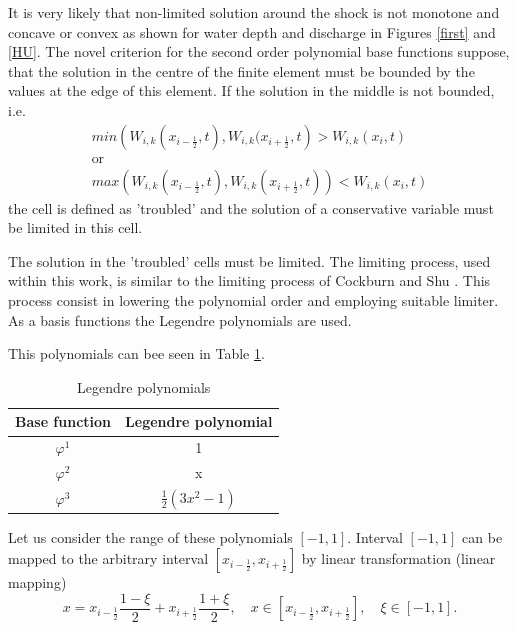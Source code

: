 It is very likely that non-limited solution around the shock is not monotone and concave or convex as shown for water depth and discharge in Figures \ref{first} and \ref{HU}. The novel criterion for the second order polynomial base functions suppose, that the solution in the centre of the finite element must be bounded by the values at the edge of this element. If the solution in the middle is not bounded, i.e.
\begin{equation}\label{crit}
\begin{array}{c}
 min\left(W_{i,k}(x_{i-\frac12},t),W_{i,k}(x_{i+\frac12},t\right)>W_{i,k}(x_i,t)\\
\text{or}\\
 max\left(W_{i,k}(x_{i-\frac12},t),W_{i,k}(x_{i+\frac12},t)\right)< W_{i,k}(x_i,t)
 \end{array}
\end{equation}
the cell is defined as 'troubled' and the solution of a conservative variable must be limited in this cell.

The solution in the 'troubled' cells must be limited. The limiting process, used within this work, is similar to the limiting process of Cockburn and Shu \cite{Cockburn1989b}. This process consist in lowering the polynomial order and employing suitable limiter. As a basis functions the Legendre polynomials are used.

 This polynomials can bee seen in Table \ref{table:legendre}.
\begin{table}
\caption{Legendre polynomials}
\centering
\begin{tabular}{|c|c |}
\hline
Base function & Legendre polynomial\\
\hline
\hline
$\varphi^1$ & 1\\
$\varphi^2$ & x\\
$\varphi^3$ & $\frac12\left(3x^2-1\right)$\\
\hline
\end{tabular}
\label{table:legendre}%
\end{table}
Let us consider the range of these polynomials $[-1,1]$. Interval $[-1,1]$ can be mapped to the arbitrary interval $[x_{i-\frac12},x_{i+\frac12}]$ by linear transformation (linear mapping)
\begin{equation}\label{mapping}
x=x_{i-\frac12}\frac{1-\xi}{2}+x_{i+\frac12}\frac{1+\xi}{2}, \quad x\in[x_{i-\frac12},x_{i+\frac12}],
\quad \xi\in[-1,1].
\end{equation}

